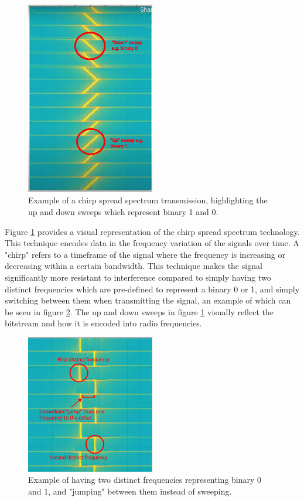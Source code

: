 \begin{figure}[H]
\centering
\includegraphics[width=0.5\textwidth]{images/chirp_spread_spectrum_labeled}
\caption{Example of a chirp spread spectrum transmission, highlighting the up and down sweeps which represent binary 1 and 0. \cite{Wenner2017_hd}}
\label{fig:chirp_spread_spectrum_labeled}
\end{figure}

Figure \ref{fig:chirp_spread_spectrum_labeled} provides a visual representation of the chirp spread spectrum technology. This technique encodes data in the frequency variation of the signals over time. A "chirp" refers to a timeframe of the signal where the frequency is increasing or decreasing within a certain bandwidth. This technique makes the signal significantly more resistant to interference compared to simply having two distinct frequencies which are pre-defined to represent a binary 0 or 1, and simply switching between them when transmitting the signal, an example of which can be seen in figure \ref{fig:frequency_shift_keying_labeled}. The up and down sweeps in figure \ref{fig:chirp_spread_spectrum_labeled} visually reflect the bitstream and how it is encoded into radio frequencies.

\begin{figure}[H]
\centering
\includegraphics[width=0.5\textwidth]{images/frequency_shift_keying_labeled.png}
\caption{Example of having two distinct frequencies representing binary 0 and 1, and "jumping" between them instead of sweeping. \cite{Wenner2017_hd}}
\label{fig:frequency_shift_keying_labeled}
\end{figure}

